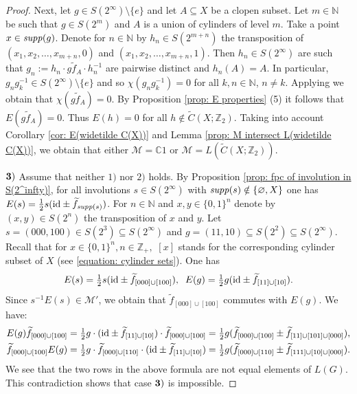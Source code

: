 \documentclass[11pt]{amsart}
\newcommand{\id}{{\rm id}}
\newcommand{\N}{\mathbb N}
\newcommand{\suppg}{{\it supp}}
\theoremstyle{plain}
\theoremstyle{definition}
\theoremstyle{remark}
\numberwithin{equation}{section}
\begin{document}
\begin{proof}
Next, let $g\in S(2^\infty)\setminus \{e\}$ and let $A\subseteq X$ be a clopen subset.
Let $m\in \N$ be such that $g\in S(2^m)$ and $A$ is a union of cylinders of level $m$. Take a point $x\in\suppg(g)$. Denote for $n \in \N$  by $h_n\in S(2^{m+n})$ the transposition of $(x_1,x_2,\ldots,x_{m+n},0)$ and $(x_1,x_2,\ldots,x_{m+n},1)$.
Then $h_n\in S(2^\infty)$ are such that $g_n:=h_n\cdot g\widetilde f_A\cdot h_n^{-1}$ are pairwise distinct and $h_n(A)=A$. In particular, $g_ng_k^{-1}\in S(2^\infty)\setminus \{e\}$ and so $\chi(g_ng_k^{-1})=0$ for all $k, n \in \N$, $n\neq k$. Applying \cite[Lemma 2.7]{dudko2024character} we obtain that $\chi(g\widetilde f_A)=0$. By Proposition \ref{prop: E properties} (5) it follows that $E(g\widetilde f_A)=0$. Thus $E(h)=0$ for all $h\notin \widetilde C(X;\mathbb{Z}_2).$ Taking into account Corollary \ref{cor: E(widetilde C(X))} and Lemma \ref{prop: M intersect L(widetilde C(X))}, we obtain that either $\mathcal M=\mathbb C1$ or $\mathcal M=L(\widetilde C(X;\mathbb Z_2))$.

\vskip 0.1cm\noindent
${\bf 3)}$ Assume that neither $1)$ nor $2)$ holds. By Proposition \ref{prop: fpc of involution in S(2^infty)}, for all involutions $s\in S(2^\infty)$ with $\suppg(s)\notin\{\varnothing,X\}$ one has $E(s)=\tfrac{1}{2}s(\id\pm \widetilde f_{\suppg(s)})$. For $n\in\mathbb N$ and $x,y\in \{0,1\}^n$ denote by $(x,y)\in S(2^n)$ the transposition of $x$ and $y$. Let $s=(000,100)\in S(2^3)\subseteq S(2^\infty)$ and $g=(11,10)\subseteq S(2^2)\subseteq S(2^\infty)$. Recall that for $x\in \{0,1\}^n,n\in\mathbb Z_+,$ $[x]$ stands for the corresponding cylinder subset of $X$ (see \eqref{equation: cylinder sets}). One has 
$$E(s)=\tfrac{1}{2}s(\id\pm \widetilde f_{[000]\cup[100]}),\;\;E(g)=\tfrac{1}{2}g(\id\pm \widetilde f_{[11]\cup[10]}).$$ Since $s^{-1}E(s)\in\mathcal M'$, we obtain that $\widetilde f_{[000]\cup[100]}$ commutes with $E(g)$. We have:
\begin{align*} E(g)\widetilde f_{[000]\cup[100]}=\tfrac{1}{2}g\cdot(\id\pm \widetilde f_{[11]\cup[10]})\cdot \widetilde f_{[000]\cup[100]}=\tfrac{1}{2}g( \widetilde f_{[000]\cup[100]}\pm \widetilde f_{[11]\cup[101]\cup [000]}),\\
\widetilde f_{[000]\cup[100]} E(g)=\tfrac{1}{2}g\cdot \widetilde f_{[000]\cup[110]}\cdot(\id\pm \widetilde f_{[11]\cup[10]})=\tfrac{1}{2}g( \widetilde f_{[000]\cup[110]}\pm \widetilde f_{[111]\cup[10]\cup [000]}).\end{align*} We see that the two rows in the above formula are not equal elements of $L(G)$. This contradiction shows that case ${\bf 3)}$ is impossible.
\end{proof}
\end{document}
